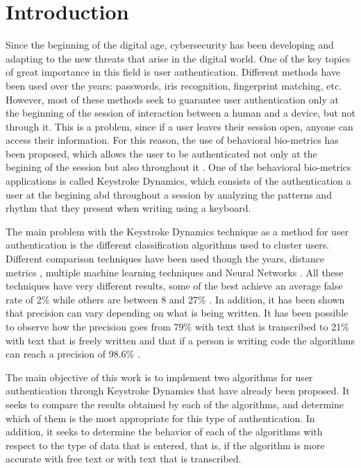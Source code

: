 \section{Introduction}

Since the beginning of the digital age, cybersecurity has been developing and adapting to 
the new threats that arise in the digital world. One of the key topics of great importance 
in this field is user authentication. Different methods have been used over the years: passwords, iris recognition, fingerprint matching, etc. However, most of these methods seek to guarantee user authentication only at the beginning of the session of interaction between a 
human and a device, but not through it. This is a problem, since if a user leaves their 
session open, anyone can access their information. For this reason, the use of behavioral bio-metrics has been proposed, which allows the user to be authenticated not only at the begining of the session but also throughout it \cite{behavior}. One of the behavioral bio-metrics applications is called Keystroke Dynamics, which consists of the authentication a user at the begining abd 
throughout a session by analyzing the patterns and rhythm that they present when writing using a keyboard.


The main problem with the Keystroke Dynamics technique as a method for user authentication 
is the different classification algorithms used to cluster users. Different comparison 
techniques have been used though the years, distance metrics \cite{combine_distance}, 
multiple machine learning techniques \cite{machine_learning} and Neural Networks 
\cite{pnn, deep_learning}. All these techniques have very different results, some of the best achieve 
an average false rate of 2\% while others are between 8 and 27\% \cite{typing_patterns}. 
In addition, it has been shown that precision can vary depending on what is being written. 
It has been possible to observe how the precision goes from 79\% with text that is transcribed 
to 21\% with text that is freely written \cite{old} and that if a person is writing code the 
algorithms can reach a precision of 98.6\% \cite{programmers}.

The main objective of this work is to implement two algorithms for user 
authentication through Keystroke Dynamics that have already been proposed. It seeks to 
compare the results obtained by each of the algorithms, and determine which of them is 
the most appropriate for this type of authentication. In addition, it seeks to determine 
the behavior of each of the algorithms with respect to the type of data that is entered, 
that is, if the algorithm is more accurate with free text or with text that is transcribed.